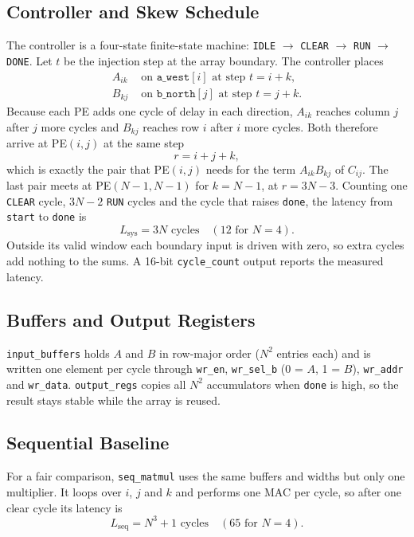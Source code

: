 \documentclass[conference,a4paper]{IEEEtran}
\begin{document}
\subsection{Controller and Skew Schedule}
The controller is a four-state finite-state machine: \texttt{IDLE} $\rightarrow$ \texttt{CLEAR} $\rightarrow$ \texttt{RUN} $\rightarrow$ \texttt{DONE}. Let $t$ be the injection step at the array boundary. The controller places
\begin{equation}
\begin{aligned}
A_{ik} &\text{ on } \texttt{a\_west}[i] \text{ at step } t = i + k,\\
B_{kj} &\text{ on } \texttt{b\_north}[j] \text{ at step } t = j + k.
\end{aligned}
\end{equation}
Because each PE adds one cycle of delay in each direction, $A_{ik}$ reaches column $j$ after $j$ more cycles and $B_{kj}$ reaches row $i$ after $i$ more cycles. Both therefore arrive at PE$(i,j)$ at the same step
\begin{equation}
r = i + j + k,
\end{equation}
which is exactly the pair that PE$(i,j)$ needs for the term $A_{ik}B_{kj}$ of $C_{ij}$. The last pair meets at PE$(N{-}1,N{-}1)$ for $k = N{-}1$, at $r = 3N - 3$. Counting one \texttt{CLEAR} cycle, $3N-2$ \texttt{RUN} cycles and the cycle that raises \texttt{done}, the latency from \texttt{start} to \texttt{done} is
\begin{equation}
L_{\text{sys}} = 3N \text{ cycles} \quad (12 \text{ for } N = 4).
\end{equation}
Outside its valid window each boundary input is driven with zero, so extra cycles add nothing to the sums. A 16-bit \texttt{cycle\_count} output reports the measured latency.

\subsection{Buffers and Output Registers}
\texttt{input\_buffers} holds $A$ and $B$ in row-major order ($N^2$ entries each) and is written one element per cycle through \texttt{wr\_en}, \texttt{wr\_sel\_b} (0 = $A$, 1 = $B$), \texttt{wr\_addr} and \texttt{wr\_data}. \texttt{output\_regs} copies all $N^2$ accumulators when \texttt{done} is high, so the result stays stable while the array is reused.

\subsection{Sequential Baseline}
For a fair comparison, \texttt{seq\_matmul} uses the same buffers and widths but only one multiplier. It loops over $i$, $j$ and $k$ and performs one MAC per cycle, so after one clear cycle its latency is
\begin{equation}
L_{\text{seq}} = N^3 + 1 \text{ cycles} \quad (65 \text{ for } N = 4).
\end{equation}
\end{document}

